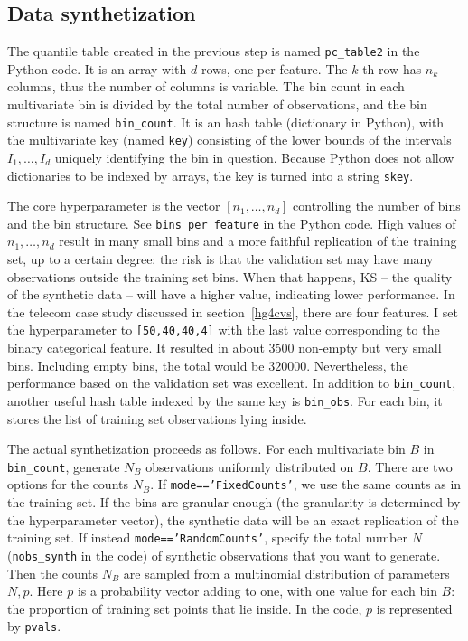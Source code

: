 \documentclass[oneside,10pt]{book}
\begin{document}
\subsection{Data synthetization}

The quantile table created in the previous step is named \texttt{pc\_table2} in the Python code. It is an array with 
 $d$ rows, one per feature. The $k$-th row has $n_k$ columns, thus the number of columns is variable.  The bin count in each multivariate bin
 is divided by the total number of observations, and the bin structure is named \texttt{bin\_count}. It is an hash table
 (dictionary in Python), with the multivariate key (named \texttt{key}) consisting of the lower bounds of the intervals $I_1,\dots,I_d$ 
  uniquely identifying the bin in question. Because Python does not allow dictionaries to be indexed by arrays, the key is turned into
 a string \texttt{skey}.

The core \textcolor{index}{hyperparameter} is the vector $[n_1,\dots,n_d]$ controlling the number of bins and the bin structure. See \texttt{bins\_per\_feature} in the Python code. High values of $n_1,\dots,n_d$ result in many small bins and a more faithful replication of the training set, up to a certain degree:  the risk is that the validation set may have many observations outside the training set bins.
When that happens, KS -- the quality of the synthetic data -- will have a higher value, indicating lower performance. In the telecom case study   
 discussed in section~\ref{hg4cvs}, there are four features. 
I set the hyperparameter to \texttt{[50,40,40,4]} with the last value corresponding to the binary categorical feature. It resulted in about 3500 non-empty but very small bins. Including
 empty bins, the total would be $\num{320000}$. Nevertheless, the performance based on the validation set was excellent.
In addition to \texttt{bin\_count}, another useful hash table indexed by the same key is \texttt{bin\_obs}. For each bin, 
it stores the list of training set observations lying inside. 

The actual synthetization proceeds as follows. For each multivariate bin $B$ in \texttt{bin\_count}, generate $N_B$ observations uniformly distributed
 on $B$. There are two options for the counts $N_B$. If \texttt{mode=='FixedCounts'}, we use the same counts as in the training set. If the bins are granular enough (the granularity is determined by the hyperparameter vector), the synthetic data will be an exact replication of the training set.
If instead \texttt{mode=='RandomCounts'}, specify the total number $N$  (\texttt{nobs\_synth} in the code) of synthetic observations that you want to
 generate. Then the counts $N_B$ are sampled from a \textcolor{index}{multinomial distribution} of parameters $N, p$.
 Here $p$ is a probability vector adding to one, with one value for each bin $B$: the proportion of training set points that lie inside. In the code,
 $p$ is represented by \texttt{pvals}.
\end{document}
